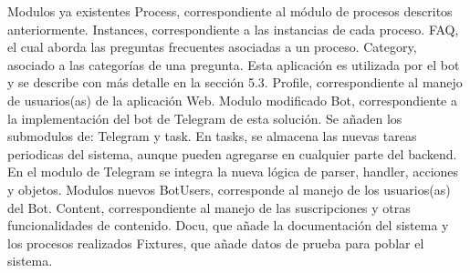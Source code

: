 Modulos ya existentes
Process, correspondiente al módulo de procesos descritos anteriormente.
Instances, correspondiente a las instancias de cada proceso.
FAQ, el cual aborda las preguntas frecuentes asociadas a un proceso.
Category, asociado a las categorías de una pregunta. Esta aplicación es utilizada por el bot y se describe con más detalle en la sección 5.3.
Profile, correspondiente al manejo de usuarios(as) de la aplicación Web.
Modulo modificado
Bot, correspondiente a la implementación del bot de Telegram de esta solución. Se añaden los submodulos de: Telegram y task. En tasks, se almacena las nuevas tareas periodicas del sistema, aunque pueden agregarse en cualquier parte del backend. En el modulo de Telegram se integra la nueva lógica de parser, handler, acciones y objetos.
Modulos nuevos
BotUsers, corresponde al manejo de los usuarios(as) del Bot.
Content, correspondiente al manejo de las suscripciones y otras funcionalidades de contenido.
Docu, que añade la documentación del sistema y los procesos realizados
Fixtures, que añade datos de prueba para poblar el sistema.


